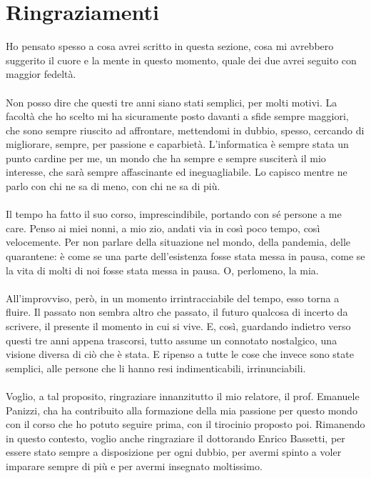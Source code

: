\chapter{Ringraziamenti}
Ho pensato spesso a cosa avrei scritto in questa sezione, cosa mi avrebbero suggerito il cuore e la mente in questo momento, quale dei due avrei seguito con maggior fedeltà. \\ \\ 
Non posso dire che questi tre anni siano stati semplici, per molti motivi. La facoltà che ho scelto mi ha sicuramente posto davanti a sfide sempre maggiori, che sono sempre riuscito ad affrontare, mettendomi in dubbio, spesso, cercando di migliorare, sempre, per passione e caparbietà. L'informatica è sempre stata un punto cardine per me, un mondo che ha sempre e sempre susciterà il mio interesse, che sarà sempre affascinante ed ineguagliabile. Lo capisco mentre ne parlo con chi ne sa di meno, con chi ne sa di più. \\ \\ 
Il tempo ha fatto il suo corso, imprescindibile, portando con sé persone a me care. Penso ai miei nonni, a mio zio, andati via in così poco tempo, così velocemente. Per non parlare della situazione nel mondo, della pandemia, delle quarantene: è come se una parte dell'esistenza fosse stata messa in pausa, come se la vita di molti di noi fosse stata messa in pausa. O, perlomeno, la mia. \\ \\ 
All'improvviso, però, in un momento irrintracciabile del tempo, esso torna a fluire. Il passato non sembra altro che passato, il futuro qualcosa di incerto da scrivere, il presente il momento in cui si vive. E, così, guardando indietro verso questi tre anni appena trascorsi, tutto assume un connotato nostalgico, una visione diversa di ciò che è stata. E ripenso a tutte le cose che invece sono state semplici, alle persone che li hanno resi indimenticabili, irrinunciabili. \\ \\ 
Voglio, a tal proposito, ringraziare innanzitutto il mio relatore, il prof. Emanuele Panizzi, cha ha contribuito alla formazione della mia passione per questo mondo con il corso che ho potuto seguire prima, con il tirocinio proposto poi. Rimanendo in questo contesto, voglio anche ringraziare il dottorando Enrico Bassetti, per essere stato sempre a disposizione per ogni dubbio, per avermi spinto a voler imparare sempre di più e per avermi insegnato moltissimo.
\\ \\ \\ \\
